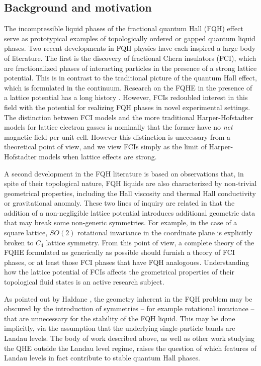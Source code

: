 \documentclass[aps,prb,twocolumn,letterpaper,twoside,nobalancelastpage,groupedaddress,amsmath,amssymb,floatfix,citeautoscript]{revtex4-1}
\begin{document}
\subsection{Background and motivation}
The incompressible liquid phases of the fractional quantum Hall (FQH) effect serve as prototypical examples of topologically ordered or gapped quantum liquid phases\cite{YoshiokaBook,FradkinBook}. Two recent developments in FQH physics have each inspired a large body of literature. The first is the discovery of fractional Chern insulators (FCI), which are fractionalized phases of interacting particles in the presence of a strong lattice potential\cite{Bergholtz:2013ue,Parameswaran2013}. This is in contrast to the traditional picture of the quantum Hall effect, which is formulated in the continuum. Research on the FQHE in the presence of a lattice potential has a long history \cite{Kol:1993hs,Sorensen:2005bt,Palmer2006}. However, FCIs redoubled interest in this field with the potential for realizing FQH phases in novel experimental settings. The distinction between FCI models and the more traditional Harper-Hofstadter \cite{Harper:1955ft,Azbel:1964tk,Hofstadter:1976js} models for lattice electron gasses is nominally that the former have no \textit{net} magnetic field per unit cell. However this distinction is unecessary from a theoretical point of view\cite{McGreevy2012}, and we view FCIs simply as the limit of Harper-Hofstadter models when lattice effects are strong.

A second development in the FQH literature is based on observations that, in spite of their topological nature, FQH liquids are also characterized by non-trivial geometrical properties, including the Hall viscosity\cite{Avron:1985fo,Read2009} and thermal Hall conductivity or gravitational anomaly\cite{Luttinger1964,Kane1997,CAPPELLI2002568,Stone2012}. These two lines of inquiry are related in that the addition of a non-negligible lattice potential introduces additional geometric data that may break some non-generic symmetries. For example, in the case of a square lattice, $SO(2)$ rotational invariance in the coordinate plane is explicitly broken to $C_4$ lattice symmetry. From this point of view, a complete theory of the FQHE formulated as generically as possible should furnish a theory of FCI phases, or at least those FCI phases that have FQH analogoues. Understanding how the lattice potential of FCIs affects the geometrical properties of their topological fluid states is an active research subject.  

As pointed out by Haldane \cite{Haldane2011}, the geometry inherent in the FQH problem may be obscured by the introduction of symmetries -- for example rotational invariance -- that are unnecessary for the stability of the FQH liquid. This may be done implicitly, via the assumption that the underlying single-particle bands are Landau levels. The body of work described above, as well as other work studying the QHE outside the Landau level regime\cite{Kapit:2010ky,Simon2105}, raises the question of which features of Landau levels in fact contribute to stable quantum Hall phases.
\end{document}
